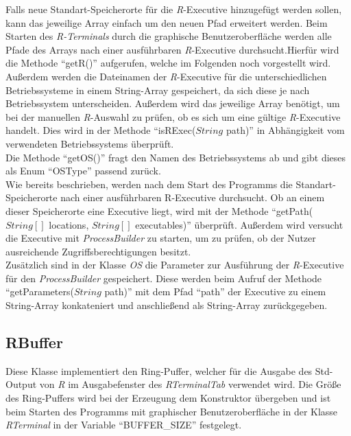 \documentclass[a4paper, 12pt]{report} %
\begin{document}
Falls neue Standart-Speicherorte für die \textit{R}-Executive hinzugefügt werden sollen, kann das jeweilige Array einfach um den neuen Pfad erweitert werden. Beim Starten des \textit{R-Terminals} durch die graphische Benutzeroberfläche werden alle Pfade des Arrays nach einer ausführbaren \textit{R}-Executive durchsucht.Hierfür wird die Methode "`getR()"' aufgerufen, welche im Folgenden noch vorgestellt wird.\\

Außerdem werden die Dateinamen der \textit{R}-Executive für die unterschiedlichen Betriebssysteme in einem String-Array gespeichert, da sich diese je nach Betriebssystem unterscheiden. Außerdem wird das jeweilige Array benötigt, um bei der manuellen \textit{R}-Auswahl zu prüfen, ob es sich um eine gültige \textit{R}-Executive handelt. Dies wird in der Methode "`isRExec($String$ path)"' in Abhängigkeit vom verwendeten Betriebssystems überprüft.\\

Die Methode "`getOS()"' fragt den Namen des Betriebssystems ab und gibt dieses als Enum "`OSType"' passend zurück.\\

Wie bereits beschrieben, werden nach dem Start des Programms die Standart-Speicherorte nach einer ausführbaren R-Executive durchsucht. Ob an einem dieser Speicherorte eine Executive liegt, wird mit der Methode "`getPath($String[]$ locations, $String[]$ executables)"' überprüft. Außerdem wird versucht die Executive mit \textit{ProcessBuilder} zu starten, um zu prüfen, ob der Nutzer ausreichende Zugriffsberechtigungen besitzt.\\

Zusätzlich sind in der Klasse \textit{OS} die Parameter zur Ausführung der \textit{R}-Executive für den \textit{ProcessBuilder} gespeichert. Diese werden beim Aufruf der Methode "`getParameters($String$ path)"' mit dem Pfad "`path"' der Executive zu einem String-Array konkateniert und anschließend als String-Array zurückgegeben.

\subsection{RBuffer} \label{RBuffer}

Diese Klasse implementiert den Ring-Puffer, welcher für die Ausgabe des Std-Output von \textit{R} im Ausgabefenster des \textit{RTerminalTab} verwendet wird.
Die Größe des Ring-Puffers wird bei der Erzeugung dem Konstruktor übergeben und ist beim Starten des Programms mit graphischer Benutzeroberfläche in der Klasse \textit{RTerminal} in der Variable "`BUFFER\_SIZE"' festgelegt.
\end{document}
